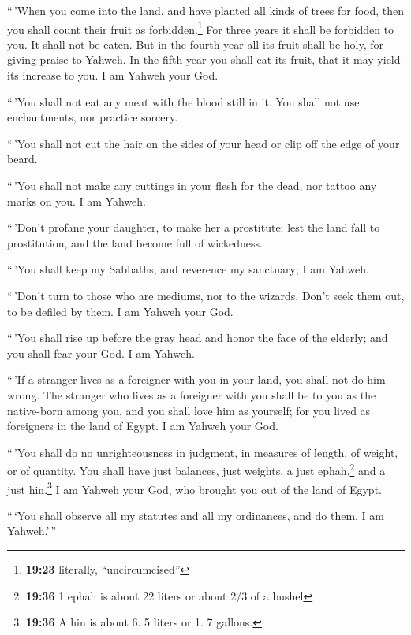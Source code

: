  ``\,'When you come into the land, and have planted all
kinds of trees for food, then you shall count their fruit as
forbidden.\footnote{\textbf{19:23} literally, ``uncircumcised''} For
three years it shall be forbidden to you. It shall not be eaten.
 But in the fourth year all its fruit shall be holy, for
giving praise to Yahweh.  In the fifth year you shall eat
its fruit, that it may yield its increase to you. I am Yahweh your God.

 ``\,'You shall not eat any meat with the blood still in
it. You shall not use enchantments, nor practice sorcery.

 ``\,'You shall not cut the hair on the sides of your
head or clip off the edge of your beard.

 ``\,'You shall not make any cuttings in your flesh for
the dead, nor tattoo any marks on you. I am Yahweh.

 ``\,'Don't profane your daughter, to make her a
prostitute; lest the land fall to prostitution, and the land become full
of wickedness.

 ``\,'You shall keep my Sabbaths, and reverence my
sanctuary; I am Yahweh.

 ``\,'Don't turn to those who are mediums, nor to the
wizards. Don't seek them out, to be defiled by them. I am Yahweh your
God.

 ``\,'You shall rise up before the gray head and honor
the face of the elderly; and you shall fear your God. I am Yahweh.

 ``\,'If a stranger lives as a foreigner with you in your
land, you shall not do him wrong.  The stranger who lives
as a foreigner with you shall be to you as the native-born among you,
and you shall love him as yourself; for you lived as foreigners in the
land of Egypt. I am Yahweh your God.

 ``\,'You shall do no unrighteousness in judgment, in
measures of length, of weight, or of quantity.  You shall
have just balances, just weights, a just ephah,\footnote{\textbf{19:36}
  1 ephah is about 22 liters or about 2/3 of a bushel} and a just
hin.\footnote{\textbf{19:36} A hin is about 6. 5 liters or 1. 7 gallons.}
I am Yahweh your God, who brought you out of the land of Egypt.

 ``\,`You shall observe all my statutes and all my
ordinances, and do them. I am Yahweh.'\,''

